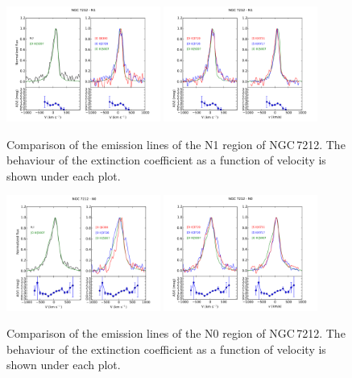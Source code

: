 \documentclass[../thesis.tex]{subfiles}
\begin{document}
\begin{figure}
\centering
\includegraphics[width=0.45\textwidth]{images/paper1/NGC7212_n1_l1.pdf} \quad
\includegraphics[width=0.45\textwidth]{images/paper1/NGC7212_n1_l2.pdf}\\
\caption[]{Comparison of the emission lines of the N1 region of NGC\,7212. The behaviour of the extinction coefficient as a function of velocity is shown under each plot.}
\label{fig:n1l1_N}
\end{figure}

\begin{figure}
\centering
\includegraphics[width=0.45\textwidth]{images/paper1/NGC7212_n0_l1.pdf} \quad
\includegraphics[width=0.45\textwidth]{images/paper1/NGC7212_n0_l2.pdf}\\
\caption[]{Comparison of the emission lines of the N0 region of NGC\,7212. The behaviour of the extinction coefficient as a function of velocity is shown under each plot.}
\label{fig:n0l1_N}
\end{figure}
\end{document}
